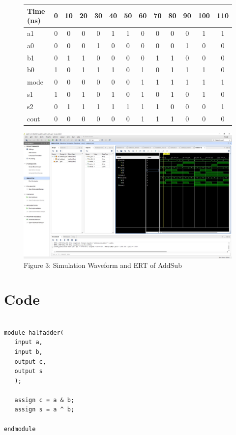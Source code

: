\documentclass[11pt]{article}
\begin{document}
\begin{figure}[ht]\centering
	\begin{tabular}[ht]{l|cccccccccccc}
		Time (ns) & 0 & 10 & 20 & 30 & 40 & 50 & 60 & 70 & 80 & 90 & 100 & 110\\
		\midrule
		a1 & 0 & 0 & 0 & 0 & 1 & 1 & 0 & 0 & 0 & 0 & 1 & 1\\
		a0 & 0 & 0 & 0 & 1 & 0 & 0 & 0 & 0 & 0 & 1 & 0 & 0\\
		b1 & 0 & 1 & 1 & 0 & 0 & 0 & 0 & 1 & 1 & 0 & 0 & 0\\
		b0 & 1 & 0 & 1 & 1 & 1 & 0 & 1 & 0 & 1 & 1 & 1 & 0\\
		mode & 0 & 0 & 0 & 0 & 0 & 0 & 1 & 1 & 1 & 1 & 1 & 1\\
		\midrule
		s1 & 1 & 0 & 1 & 0 & 1 & 0 & 1 & 0 & 1 & 0 & 1 & 0\\
		s2 & 0 & 1 & 1 & 1 & 1 & 1 & 1 & 1 & 0 & 0 & 0 & 1\\
		cout & 0 & 0 & 0 & 0 & 0 & 0 & 1 & 1 & 1 & 0 & 0 & 0\\
		\bottomrule
	\end{tabular}\medskip
	
	\includegraphics [width=1.0\textwidth,trim=640 450 10 135, clip]{addsub_pic}
	\caption{Figure 3: Simulation Waveform and ERT of AddSub}
	\label{fig:sim_with_table}
	
\end{figure}


\section*{Code}

\begin{lstlisting}

module halfadder(
   input a,
   input b,
   output c,
   output s
   );

   assign c = a & b;
   assign s = a ^ b;

endmodule

\end{lstlisting}
\end{document}
